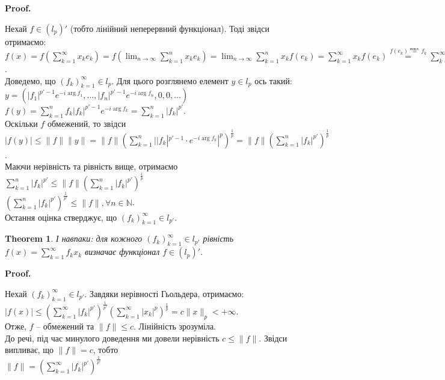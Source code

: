 \documentclass[a4paper, 10pt]{article}
\makeatletter
\theoremstyle{theoremdd}
\newtheorem{theorem}{Theorem}[subsection]
\theoremstyle{theoremdd}
\theoremstyle{theoremdd}
\theoremstyle{theoremdd}
\theoremstyle{theoremdd}
\theoremstyle{theoremdd}
\theoremstyle{theoremdd}
\theoremstyle{theoremdd}
\renewenvironment{proof}[1][Proof.\\]{\par
\pushQED{\hfill \qed}%
\normalfont \topsep6\p@\@plus6\p@\relax
\trivlist
\item\relax
{\bfseries
#1\@addpunct{.}}\hspace\labelsep\ignorespaces
}{%
\popQED\endtrivlist\@endpefalse
}
\makeatother
\begin{document}
\begin{proof}
Нехай $f \in (l_p)'$ (тобто лінійний неперервний функціонал). Тоді звідси отримаємо:\\
$f(x) = \displaystyle f\left( \sum_{k=1}^\infty x_k e_k \right) = f\left( \lim_{n \to \infty} \sum_{k=1}^n x_k e_k \right) = \lim_{n \to \infty} \sum_{k=1}^n x_k f(e_k) = \sum_{k=1}^\infty x_k f(e_k) \overset{f(e_k) \overset{\text{покл.}}{=} f_k}{=} \sum_{k=1}^\infty f_k x_k$.\\
Доведемо, що $(f_k)_{k=1}^\infty \in l_p$. Для цього розглянемо елемент $y \in l_p$ ось такий:\\
$y = \left( |f_1|^{p'-1}e^{-i \arg f_1}, \dots, |f_n|^{p'-1}e^{-i \arg f_n}, 0, 0, \dots \right)$\\
$f(y) = \displaystyle\sum_{k=1}^n f_k |f_k|^{p'-1} e^{-i \arg f_k} = \sum_{k=1}^n |f_k|^{p'}$.\\
Оскільки $f$ обмежений, то звідси\\
$\displaystyle |f(y)| \leq \|f\| \|y\| = \|f\| \left( \sum_{k=1}^n  ||f_k|^{p'-1} \cdot e^{-i \arg f_k}|^p \right)^{\frac{1}{p}} = \|f\| \left( \sum_{k=1}^n |f_k|^{p'} \right)^{\frac{1}{p}}$.\\
Маючи нерівність та рівність вище, отримаємо\\
$\displaystyle\sum_{k=1}^n |f_k|^{p'} \leq \| f\| \left( \sum_{k=1}^n |f_k|^{p'} \right)^{\frac{1}{p}}$\\
$\displaystyle \left( \sum_{k=1}^n |f_k|^{p'} \right)^{\frac{1}{p'}} \leq \|f\|, \forall n \in \mathbb{N}$.\\
Остання оцінка стверджує, що $(f_k)_{k=1}^{\infty} \in l_{p'}$.
\end{proof}

\begin{theorem}
І навпаки: для кожного $(f_k)_{k=1}^\infty \in l_{p'}$ рівність $f(x) = \displaystyle\sum_{k=1}^\infty f_k x_k$ визначає функціонал $f \in (l_p)'$.
\end{theorem}

\begin{proof}
Нехай $(f_k)_{k=1}^\infty \in l_{p'}$. Завдяки нерівності Гьольдера, отримаємо:\\
$\displaystyle |f(x)| \leq \left( \sum_{k=1}^\infty |f_k|^{p'} \right)^{\frac{1}{p'}} \left( \sum_{k=1}^\infty |x_k|^p \right)^{\frac{1}{p}} = c \| x \|_p < +\infty$.\\
Отже, $f$ -- обмежений та $\|f\| \leq c$. Лінійність зрозуміла.
\bigskip \\
До речі, під час минулого доведення ми довели нерівність $c \leq \|f\|$. Звідси випливає, що $\|f\| = c$, тобто\\
$\|f\| =  \displaystyle\left( \sum_{k=1}^\infty |f_k|^{p'} \right)^{\frac{1}{p'}}$
\end{proof}
\newpage
\end{document}
